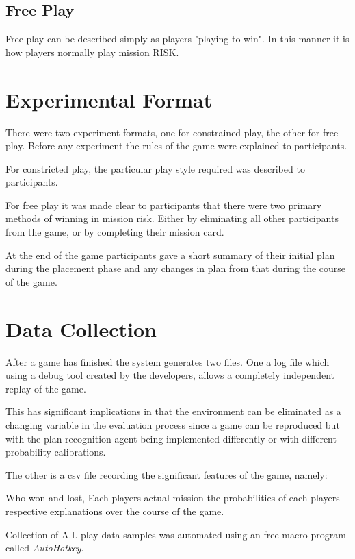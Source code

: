 \documentclass[parskip]{cs4rep}
\begin{document}
\subsection{Free Play}

Free play can be described simply as players "playing to win". In this manner it is how players normally play mission RISK.

\section{Experimental Format}

There were two experiment formats, one for constrained play, the other for free play. Before any experiment the rules of the game were explained to participants. 

For constricted play, the particular play style required was described to participants.

For free play it was made clear to participants that there were two primary methods of winning in mission risk. Either by eliminating all other participants from the game, or by completing their mission card.

At the end of the game participants gave a short summary of their initial plan during the placement phase and any changes in plan from that during the course of the game.

\section{Data Collection}

After a game has finished the system generates two files. One a log file which using a debug tool created by the developers, allows a completely independent replay of the game. 

This has significant implications in that the environment can be eliminated as a changing variable in the evaluation process since a game can be reproduced but with the plan recognition agent being implemented differently or with different probability calibrations. 

The other is a csv file recording the significant features of the game, namely:

Who won and lost, 
Each players actual mission
the probabilities of each players respective explanations over the course of the game.

Collection of A.I. play data samples was automated using an free macro program called \textit{AutoHotkey}. 
\end{document}
